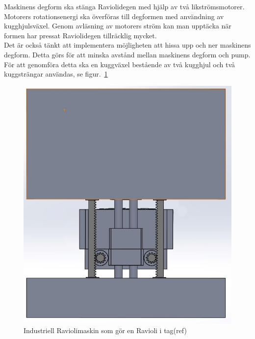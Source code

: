 Maskinens degform ska stänga Raviolidegen med hjälp av två likströmsmotorer. Motorers rotationsenergi ska överföras till degformen med användning av kugghjulsväxel.  Genom avläsning av motorers ström kan man upptäcka när formen har pressat Raviolidegen tillräcklig mycket.\\

Det är också tänkt att implementera möjligheten att hissa upp och ner maskinens degform. Detta görs för att minska avstånd mellan maskinens degform och pump. För att genomföra detta ska en kuggväxel bestående av två kugghjul och två kuggsträngar användas, se figur.~\ref{motordrivendegform}

\begin{figure}[ht]
	\begin{center}
		\includegraphics[scale=0.8]{images/maskinenshiss.jpg}
		\caption{Industriell Raviolimaskin som gör en Ravioli i tag(ref)}
		\label{motordrivendegform}	
	\end{center}
\end{figure}

